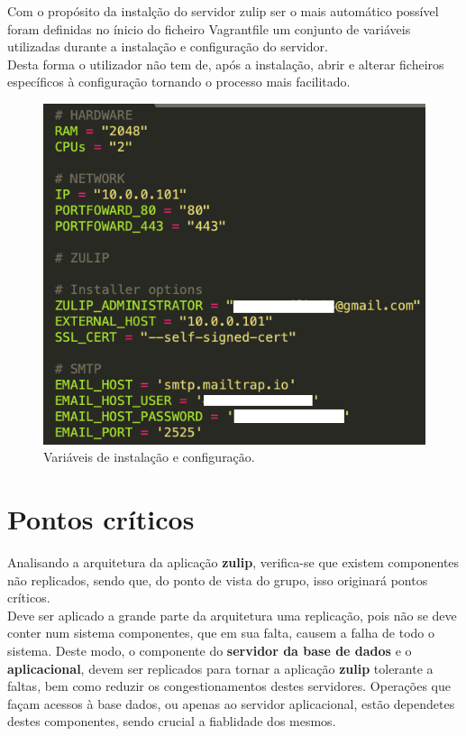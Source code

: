 \documentclass[11pt,a4paper]{report}%
\begin{document}
Com o propósito da instalção do servidor zulip ser o mais automático possível foram definidas no ínicio do ficheiro Vagrantfile um conjunto de variáveis utilizadas durante a instalação e configuração do servidor. \\ 
Desta forma o utilizador não tem de, após a instalação, abrir e alterar ficheiros específicos à configuração tornando o processo mais facilitado.
\begin{figure}[H]
	\centering
	\includegraphics[scale=0.6]{automatizacao.png}
	\caption{Variáveis de instalação e configuração.}
	\label{img:pag}
\end{figure}
\chapter{Pontos críticos}

Analisando a arquitetura da aplicação \textbf{zulip}, verifica-se que existem componentes não replicados, sendo que, do ponto de vista do grupo, isso originará pontos críticos.\\

Deve ser aplicado a grande parte da arquitetura uma replicação, pois não se deve conter num sistema componentes, que em sua falta, causem a falha de todo o sistema. Deste modo, o componente do \textbf{servidor da base de dados} e o \textbf{aplicacional}, devem ser replicados para tornar a aplicação \textbf{zulip} tolerante a faltas, bem como reduzir os congestionamentos destes servidores. Operações que façam acessos à base dados, ou apenas ao servidor aplicacional, estão dependetes destes componentes, sendo crucial a fiablidade dos mesmos.\\
\end{document}
